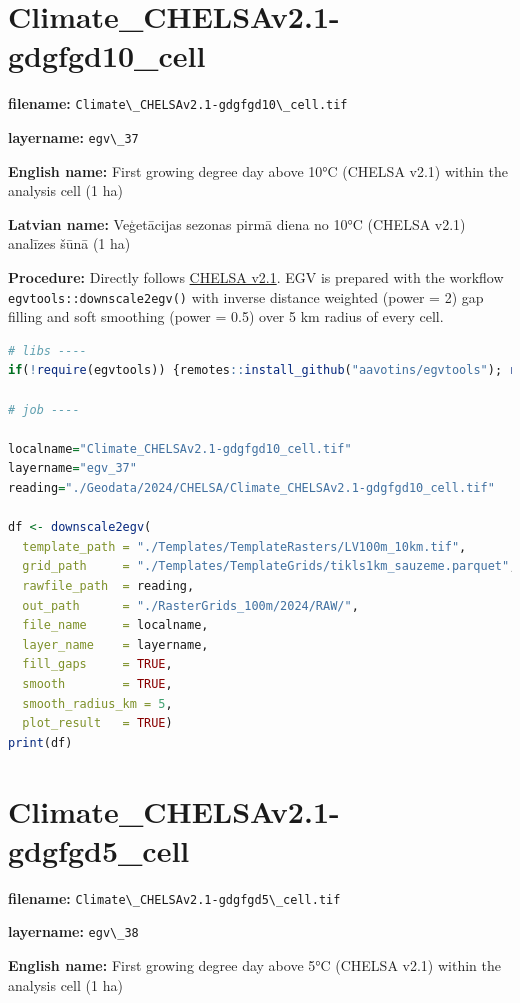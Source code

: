 \documentclass[
]{book}
\newcommand{\passthrough}[1]{#1}
\begin{document}
\section{Climate\_CHELSAv2.1-gdgfgd10\_cell}\label{ch06.037}

\textbf{filename:} \passthrough{\lstinline!Climate\_CHELSAv2.1-gdgfgd10\_cell.tif!}

\textbf{layername:} \passthrough{\lstinline!egv\_37!}

\textbf{English name:} First growing degree day above 10°C (CHELSA v2.1) within the analysis cell (1 ha)

\textbf{Latvian name:} Veģetācijas sezonas pirmā diena no 10°C (CHELSA v2.1) analīzes šūnā (1 ha)

\textbf{Procedure:} Directly follows \hyperref[Ch04.11]{CHELSA v2.1}. EGV is prepared with the
workflow \passthrough{\lstinline!egvtools::downscale2egv()!} with inverse distance weighted (power = 2)
gap filling and soft smoothing (power = 0.5) over 5 km radius of every cell.

\begin{lstlisting}[language=R]
# libs ----
if(!require(egvtools)) {remotes::install_github("aavotins/egvtools"); require(egvtools)}

# job ----

localname="Climate_CHELSAv2.1-gdgfgd10_cell.tif"
layername="egv_37"
reading="./Geodata/2024/CHELSA/Climate_CHELSAv2.1-gdgfgd10_cell.tif"

df <- downscale2egv(
  template_path = "./Templates/TemplateRasters/LV100m_10km.tif",
  grid_path     = "./Templates/TemplateGrids/tikls1km_sauzeme.parquet",
  rawfile_path  = reading,
  out_path      = "./RasterGrids_100m/2024/RAW/",
  file_name     = localname,
  layer_name    = layername,
  fill_gaps     = TRUE,
  smooth        = TRUE,
  smooth_radius_km = 5,
  plot_result   = TRUE)
print(df)
\end{lstlisting}

\section{Climate\_CHELSAv2.1-gdgfgd5\_cell}\label{ch06.038}

\textbf{filename:} \passthrough{\lstinline!Climate\_CHELSAv2.1-gdgfgd5\_cell.tif!}

\textbf{layername:} \passthrough{\lstinline!egv\_38!}

\textbf{English name:} First growing degree day above 5°C (CHELSA v2.1) within the analysis cell (1 ha)
\end{document}
